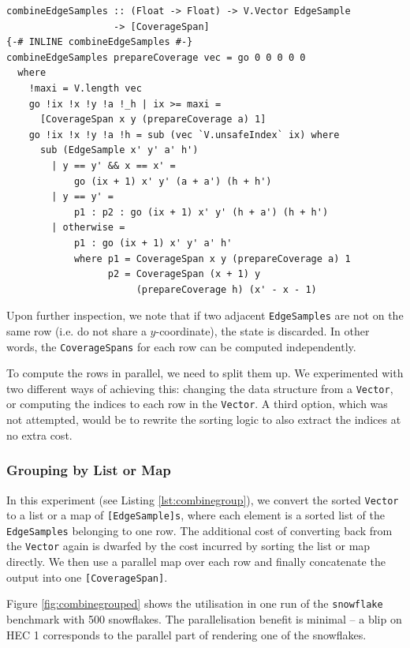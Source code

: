 \documentclass[12pt, a4paper]{article}
\begin{document}
\begin{lstlisting}[caption={Combining the edge samples.}]
combineEdgeSamples :: (Float -> Float) -> V.Vector EdgeSample
                   -> [CoverageSpan]
{-# INLINE combineEdgeSamples #-}
combineEdgeSamples prepareCoverage vec = go 0 0 0 0 0
  where
    !maxi = V.length vec
    go !ix !x !y !a !_h | ix >= maxi =
      [CoverageSpan x y (prepareCoverage a) 1]
    go !ix !x !y !a !h = sub (vec `V.unsafeIndex` ix) where
      sub (EdgeSample x' y' a' h')
        | y == y' && x == x' =
            go (ix + 1) x' y' (a + a') (h + h')
        | y == y' =
            p1 : p2 : go (ix + 1) x' y' (h + a') (h + h')
        | otherwise =
            p1 : go (ix + 1) x' y' a' h'
            where p1 = CoverageSpan x y (prepareCoverage a) 1
                  p2 = CoverageSpan (x + 1) y
                       (prepareCoverage h) (x' - x - 1)
\end{lstlisting}

Upon further inspection, we note that if two adjacent \texttt{EdgeSamples} are not on the same row (i.e. do not share a $y$-coordinate), the state is discarded. In other words, the \texttt{CoverageSpans} for each row can be computed independently.

To compute the rows in parallel, we need to split them up. We experimented with two different ways of achieving this: changing the data structure from a \texttt{Vector}, or computing the indices to each row in the \texttt{Vector}. A third option, which was not attempted,  would be to rewrite the sorting logic to also extract the indices at no extra cost.

\subsubsection{Grouping by List or Map}

In this experiment (see Listing \ref{lst:combinegroup}), we convert the sorted \texttt{Vector} to a list or a map of \texttt{[EdgeSample]s}, where each element is a sorted list of the \texttt{EdgeSamples} belonging to one row. The additional cost of converting back from the \texttt{Vector} again is dwarfed by the cost incurred by sorting the list or map directly. We then use a parallel map over each row and finally concatenate the output into one \texttt{[CoverageSpan]}.

Figure \ref{fig:combinegrouped} shows the utilisation in one run of the \texttt{snowflake} benchmark with 500 snowflakes. The parallelisation benefit is minimal -- a blip on HEC 1 corresponds to the parallel part of rendering one of the snowflakes.
\end{document}
